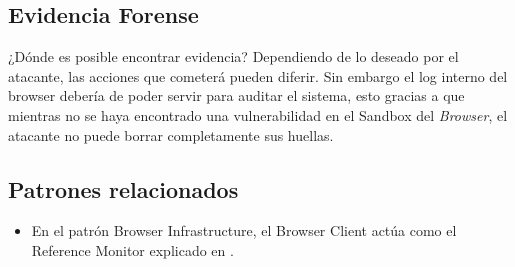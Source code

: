 \subsection{Evidencia Forense}
	¿Dónde es posible encontrar evidencia?
	Dependiendo de lo deseado por el atacante, las acciones que cometerá pueden diferir. Sin embargo el log interno del browser debería de poder servir para auditar el sistema, esto gracias a que mientras no se haya encontrado una vulnerabilidad en el Sandbox del \textit{Browser}, el atacante no puede borrar completamente sus huellas.

\subsection{Patrones relacionados}
	\begin{itemize}
		\item En el patrón Browser Infrastructure, el Browser Client actúa como el Reference Monitor explicado en \cite{fernandez2001pattern}.
	\end{itemize}
